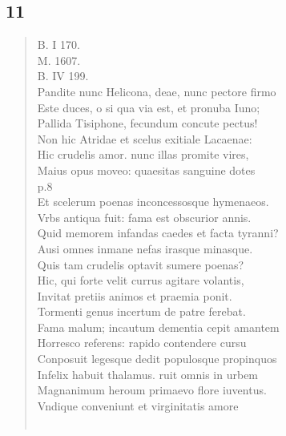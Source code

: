 \documentclass[11pt, a4paper]{report}
\begin{document}
            \subsection*{11}
      \begin{verse}
      B. I 170. \\ M. 1607. \\ B. IV 199. \\ Pandite nunc Helicona, deae, nunc pectore firmo \\ Este duces, o si qua via est, et pronuba Iuno; \\ Pallida Tisiphone, fecundum concute pectus! \\ Non hic Atridae et scelus exitiale Lacaenae: \\ Hic crudelis amor. nunc illas promite vires, \\ Maius opus moveo: quaesitas sanguine dotes \\ p.8 \\ Et scelerum poenas inconcessosque hymenaeos. \\ Vrbs antiqua fuit: fama est obscurior annis. \\ Quid memorem infandas caedes et facta tyranni? \\ Ausi omnes inmane nefas irasque minasque. \\ Quis tam crudelis optavit sumere poenas? \\ Hic, qui forte velit currus agitare volantis, \\ Invitat pretiis animos et praemia ponit. \\ Tormenti genus incertum de patre ferebat. \\ Fama malum; incautum dementia cepit amantem \\ Horresco referens: rapido contendere cursu \\ Conposuit legesque dedit populosque propinquos \\ Infelix habuit thalamus. ruit omnis in urbem \\ Magnanimum heroum primaevo flore iuventus. \\ Vndique conveniunt et virginitatis amore \\ 
        ﻿\pagebreak 

\end{verse}
\end{document}
